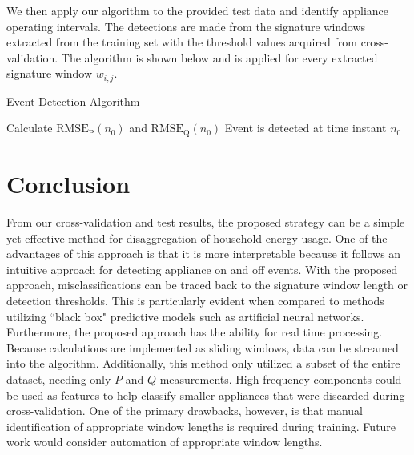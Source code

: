 \documentclass[conference]{IEEEtran}
\begin{document}

We then apply our algorithm to the provided test data and identify appliance operating intervals.  The detections are made from the signature windows extracted from the training set with the threshold values acquired from cross-validation.  The algorithm is shown below and is applied for every extracted signature window $w_{i,j}$.

\begin{algorithm}
	\caption{Event Detection Algorithm}\label{euclid}
	\begin{algorithmic}[1]
			\State Calculate $\text{RMSE}_{\text{P}}(n_0)$ and $\text{RMSE}_{\text{Q}}(n_0)$
			\State Event is detected at time instant $n_0$
			\EndIf
	\EndFor
	\end{algorithmic}
\end{algorithm}

\section{Conclusion}\label{sec:concl}
From our cross-validation and test results, the proposed strategy can be a simple yet effective method for disaggregation of household energy usage. One of the advantages of this approach is that it is more interpretable because it follows an intuitive approach for detecting appliance on and off events.  With the proposed approach, misclassifications can be traced back to the signature window length or detection thresholds.  This is particularly evident when compared to methods utilizing ``black box" predictive models such as artificial neural networks.  Furthermore, the proposed approach has the ability for real time processing. Because calculations are implemented as sliding windows, data can be streamed into the algorithm. Additionally, this method only utilized a subset of the entire dataset, needing only $P$ and $Q$ measurements.  High frequency components could be used as features to help classify smaller appliances that were discarded during cross-validation.  One of the primary drawbacks, however, is that manual identification of appropriate window lengths is required during training.  Future work would consider automation of appropriate window lengths.
\end{document}
